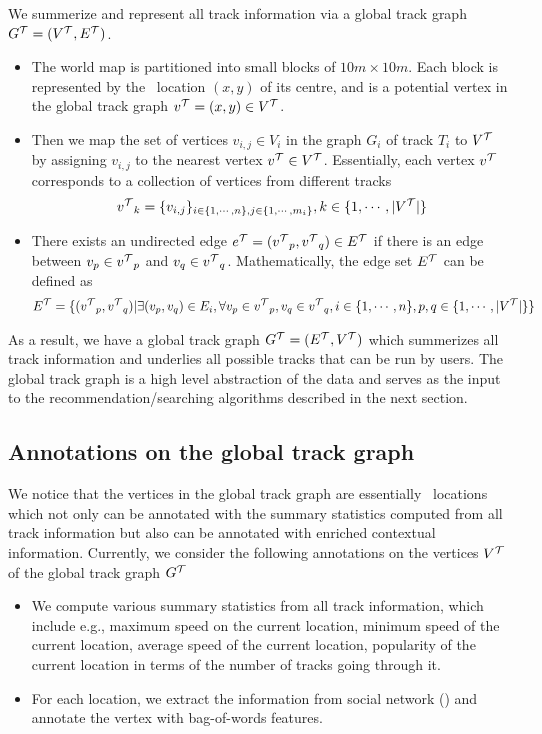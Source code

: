 We summerize and represent all track information via a global track graph ${G^{\mathcal{T}}}=({V^{\mathcal{T}}},{E^{\mathcal{T}}})$.
\begin{itemize}
	\item The world map is partitioned into small blocks of $10m\times10m$. Each block is represented by the \gps\ location $(x,y)$ of its centre, and is a potential vertex in the global track graph ${v^{\mathcal{T}}}=(x,y)\in{V^{\mathcal{T}}}$. 
	\item Then we map the set of vertices $v_{i,j}\in V_i$ in the graph $G_i$ of track $T_i$ to ${V^{\mathcal{T}}}$ by assigning $v_{i,j}$ to the nearest vertex ${v^{\mathcal{T}}}\in{V^{\mathcal{T}}}$. Essentially, each vertex ${v^{\mathcal{T}}}$ corresponds to a collection of vertices from different tracks
	\begin{align*}
		{v^{\mathcal{T}}}_k = \{v_{i,j}\}_{i\in\{1,\cdots,n\}, j\in\{1,\cdots,m_i\}}, k\in\{1,\cdots,|{V^{\mathcal{T}}}|\}
	\end{align*}
	\item There exists an undirected edge ${e^{\mathcal{T}}}=({v^{\mathcal{T}}}_p,{v^{\mathcal{T}}}_q)\in{E^{\mathcal{T}}}$ if there is an edge between $v_p\in{v^{\mathcal{T}}}_p$ and $v_q\in{v^{\mathcal{T}}}_q$. Mathematically, the edge set ${E^{\mathcal{T}}}$ can be defined as
	\begin{align*}
		{E^{\mathcal{T}}} = \{({v^{\mathcal{T}}}_p,{v^{\mathcal{T}}}_q)|\exists (v_p,v_q)\in E_i, \forall v_p\in{v^{\mathcal{T}}}_p,v_q\in{v^{\mathcal{T}}}_q, i\in\{1,\cdots,n\},p,q\in\{1,\cdots,|{V^{\mathcal{T}}}|\}\}
	\end{align*}
\end{itemize}

As a result, we have a global track graph ${G^{\mathcal{T}}}=({E^{\mathcal{T}}},{V^{\mathcal{T}}})$ which summerizes all track information and underlies all possible tracks that can be run by users.
The global track graph is a high level abstraction of the data and serves as the input to the recommendation/searching algorithms described in the next section. 

\subsection{Annotations on the global track graph}

We notice that the vertices in the global track graph are essentially \gps\ locations which not only can be annotated with the summary statistics computed from all track information but also can be annotated with enriched contextual information. 
Currently, we consider the following annotations on the vertices ${V^{\mathcal{T}}}$ of the global track graph ${G^{\mathcal{T}}}$
\begin{itemize}
	\item We compute various summary statistics from all track information, which include e.g., maximum speed on the current location, minimum speed of the current location, average speed of the current location, popularity of the current location in terms of the number of tracks going through it.
	\item For each location, we extract the information from social network (\twitter) and annotate the vertex with bag-of-words features.
\end{itemize}

